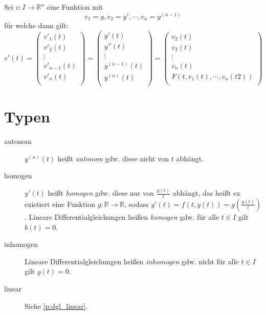 \documentclass[a4paper, 11pt, accentcolor = tud3b]{tudreport}
\begin{document}
            Sei $ v : I \rightarrow \mathbb{R} ^ n $ eine Funktion mit \[ v _ 1 = y, v _ 2 = y', \cdots, v _ n = y ^ {( n - 1 )} \] für welche dann gilt:
            \begin{equation*}
                v'(t) =
                \begin{pmatrix}
                    v' _ 1 (t) \\
                    v' _ 2 (t) \\
                    \vdots \\
                    v' _ { n - 1 } (t) \\
                    v' _ n (t) \\
                \end{pmatrix}
                =
                \begin{pmatrix}
                    y'(t) \\
                    y''(t) \\
                    \vdots \\
                    y ^ {(n - 1)} (t) \\
                    y ^ {(n)} (t) \\
                \end{pmatrix}
                =
                \begin{pmatrix}
                    v _ 2 (t) \\
                    v _ 3 (t) \\
                    \vdots \\
                    v _ n (t) \\
                    F(t, v _ 1 (t), \cdots, v _ n (t2)) \\
                \end{pmatrix}
            \end{equation*}


        \section{Typen}
            \begin{description}
                \item[autonom] $ y ^ {(n)} (t) $ heißt \textit{autonom} gdw. diese nicht von $ t $ abhängt.
                \item[homogen] $ y'(t) $ heißt \textit{homogen} gdw. diese nur von $ \frac{y(t)}{t} $ abhängt, das heißt ex existiert eine Funktion $ g : \mathbb{R} \rightarrow \mathbb{R} $, sodass $ y'(t) = f(t, y(t)) = g(\frac{y(t)}{t}) $. Lineare Differentialgleichungen heißen \textit{homogen} gdw. für alle $ t \in I $ gilt $ b(t) = 0 $.
                \item[inhomogen] Lineare Differentialgleichungen heißen \textit{inhomogen} gdw. nicht für alle $ t \in I $ gilt $ g(t) = 0 $.
                \item[linear] Siehe \ref{p:dgl_linear}.
            \end{description}
\end{document}
